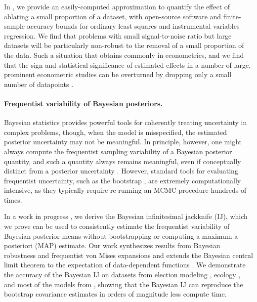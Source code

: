 In \citet{giordano:2020:amip}, we provide an easily-computed approximation to
quantify the effect of ablating a small proportion of a dataset, with
open-source software and finite-sample accuracy bounds for ordinary least
squares and instrumental variables regression. We find that problems with small
signal-to-noise ratio but large datasets will be particularly non-robust to the
removal of a small proportion of the data. Such a situation that obtains
commonly in econometrics, and we find that the sign and statistical significance
of estimated effects in a number of large, prominent econometric studies can be
overturned by dropping only a small number of datapoints
\citep{angelucci:2009:indirect, finkelstein:2012:oregon, meager:2019:microcredit}.


\paragraph{Frequentist variability of Bayesian posteriors.}

Bayesian statistics provides powerful tools for coherently treating uncertainty
in complex problems, though, when the model is misspecified, the estimated
posterior uncertainty may not be meaningful.  In principle, however, one might
always compute the frequentist sampling variability of a Bayesian posterior
quantity, and such a quantity always remains meaningful, even if conceptually
distinct from a posterior uncertainty \citep{waddell:2002:bayesphyloboot,
kleijn:2006:misspecification}.  However, standard tools for evaluating
frequentist uncertainty, such as the bootstrap \citep{huggins:2019:bayesbag},
are extremely computationally intensive, as they typically require re-running an
MCMC procedure hundreds of times.

In a work in progress \citep{giordano:2020:bayesij}, we derive the Bayesian
infinitesimal jackknife (IJ), which we prove can be used to consistently
estimate the frequentist variability of Bayesian posterior means without
bootstrapping or computing a maximum a-posteriori (MAP) estimate.  Our work
synthesizes results from Bayesian robustness and frequentist von Mises
expansions and extends the Bayesian central limit theorem to the expectation of
data-dependent functions
\citep{jaeckel:1972:infinitesimal,shao:2012:jackknife,giordano:2019:ij,gustafson:2012:localrobustnessbook,giordano:2018:covariances,
lehman:1983:pointestimation, kass:1990:posteriorexpansions}. We demonstrate the
accuracy of the Bayesian IJ on datasets from election modeling
\citep{economist:2020:election}, ecology \citep{kery:2011:bayesian}, and most of
the models from \citep{gelman:2006:arm, stan-examples:2017}, showing that the
Bayesian IJ can reproduce the bootstrap covariance estimates in orders of
magnitude less compute time.



